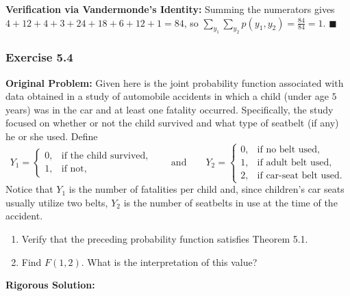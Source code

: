 \documentclass[11pt, letterpaper]{article}
\theoremstyle{definition}
\theoremstyle{remark}
\begin{document}
\textbf{Verification via Vandermonde's Identity:} Summing the numerators gives $4 + 12 + 4 + 3 + 24 + 18 + 6 + 12 + 1 = 84$, so $\sum_{y_1}\sum_{y_2} p(y_1, y_2) = \frac{84}{84} = 1$. $\blacksquare$

\bigskip

\subsubsection*{Exercise 5.4}
\textbf{Original Problem:} Given here is the joint probability function associated with data obtained in a study of automobile accidents in which a child (under age $5$ years) was in the car and at least one fatality occurred. Specifically, the study focused on whether or not the child survived and what type of seatbelt (if any) he or she used. Define
\[
    Y_1 = \begin{cases}
        0, & \text{if the child survived,} \\
        1, & \text{if not,}
    \end{cases} \qquad \text{and} \qquad
    Y_2 = \begin{cases}
        0, & \text{if no belt used,} \\
        1, & \text{if adult belt used,} \\
        2, & \text{if car-seat belt used.}
    \end{cases}
\]
Notice that $Y_1$ is the number of fatalities per child and, since children's car seats usually utilize two belts, $Y_2$ is the number of seatbelts in use at the time of the accident.
\begin{enumerate}[label=\textbf{\alph*}]
    \item Verify that the preceding probability function satisfies Theorem 5.1.
    \item Find $F(1, 2)$. What is the interpretation of this value?
\end{enumerate}

\textbf{Rigorous Solution:}
\end{document}
